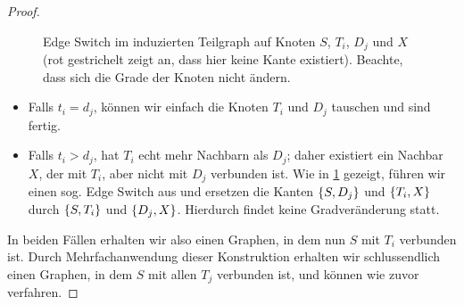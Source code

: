 \begin{proof}
\begin{figure}
\begin{center}
        \end{center}
        \caption{
            Edge Switch im induzierten Teilgraph auf Knoten $S$, $T_i$, $D_j$ und $X$
            (rot gestrichelt zeigt an, dass hier keine Kante existiert).
            Beachte, dass sich die Grade der Knoten nicht ändern.
        }
        \label{fig:hh_edge_switch}
    \end{figure}

    \begin{itemize}
        \item
              Falls $t_i = d_j$, können wir einfach die Knoten $T_i$ und $D_j$ tauschen und sind fertig.
        \item
              Falls $t_i > d_j$, hat $T_i$ echt mehr Nachbarn als $D_j$; daher existiert ein Nachbar $X$, der mit $T_i$, aber nicht mit $D_j$ verbunden ist.
              Wie in \cref{fig:hh_edge_switch} gezeigt, führen wir einen sog. Edge Switch aus und ersetzen die Kanten $\left\{S, D_j\right\}$ und $\left\{T_i, X\right\}$ durch $\left\{S, T_i\right\}$ und $\left\{D_j, X\right\}$.
              Hierdurch findet keine Gradveränderung statt.
    \end{itemize}

    In beiden Fällen erhalten wir also einen Graphen, in dem nun $S$ mit $T_i$ verbunden ist.
    Durch Mehrfachanwendung dieser Konstruktion erhalten wir schlussendlich einen Graphen, in dem $S$ mit allen $T_j$ verbunden ist, und können wie zuvor verfahren.
\end{proof}

